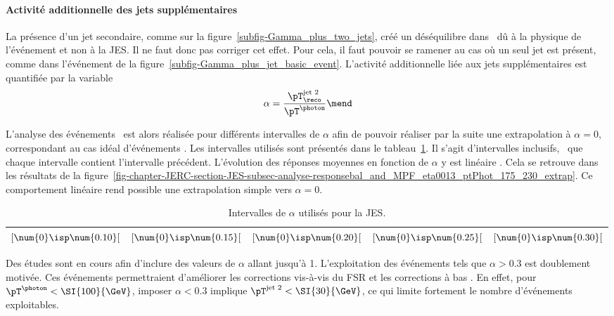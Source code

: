 \paragraph{Activité additionnelle des jets supplémentaires}
La présence d'un jet secondaire, comme sur la figure~\ref{subfig-Gamma_plus_two_jets}, créé un déséquilibre dans \Rbal\ dû à la physique de l'événement et non à la JES. Il ne faut donc pas corriger cet effet.
Pour cela, il faut pouvoir se ramener au cas où un seul jet est présent, comme dans l'événement de la figure~\ref{subfig-Gamma_plus_jet_basic_event}.
L'activité additionnelle liée aux jets supplémentaires est quantifiée par la variable
\begin{equation}
\alpha = \frac{\pT_\reco^\text{jet 2}}{\pT^{\photon}}
\mend
\label{eq-chapter-JERC-definition_alpha}
\end{equation}
\par L'analyse des événements \Gjets\ est alors réalisée pour différents intervalles de $\alpha$ afin de pouvoir réaliser par la suite une extrapolation à $\alpha=0$, correspondant au cas idéal d'événements \Gjet.
Les intervalles utilisés sont présentés dans le tableau~\ref{tab-alpha_intervalles}.
Il s'agit d'intervalles inclusifs, \ie\ que chaque intervalle contient l'intervalle précédent.
L'évolution des réponses moyennes en fonction de $\alpha$ y est linéaire \aposteriori.
Cela se retrouve dans les résultats de la figure~\ref{fig-chapter-JERC-section-JES-subsec-analyse-responsebal_and_MPF_eta0013_ptPhot_175_230_extrap}.
Ce comportement linéaire rend possible une extrapolation simple vers $\alpha=0$.
\begin{table}[h]
\centering
\begin{tabular}{ccccc}
\toprule
$[\num{0}\isp \num{0.10}[$ & $[\num{0}\isp \num{0.15}[$ & $[\num{0}\isp \num{0.20}[$ & $[\num{0}\isp \num{0.25}[$ & $[\num{0}\isp \num{0.30}[$ \\
\bottomrule
\end{tabular}
\caption{Intervalles de $\alpha$ utilisés pour la JES.}
\label{tab-alpha_intervalles}
\end{table}
\par Des études sont en cours afin d'inclure des valeurs de $\alpha$ allant jusqu'à \num{1}.
L'exploitation des événements tels que $\alpha>\num{0.3}$ est doublement motivée.
Ces événements permettraient d'améliorer les corrections vis-à-vis du FSR et les corrections à bas \pT.
En effet, pour $\pT^{\photon}<\SI{100}{\GeV}$, imposer $\alpha<\num{0.3}$ implique $\pT^\text{jet 2}<\SI{30}{\GeV}$, ce qui limite fortement le nombre d'événements exploitables.
